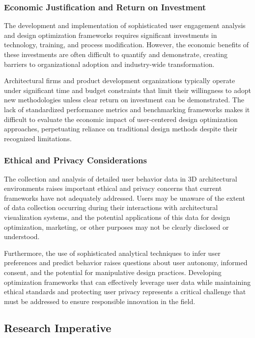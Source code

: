\subsubsection{Economic Justification and Return on Investment}
\label{subsubsec:economic_justification}

The development and implementation of sophisticated user engagement analysis and design optimization frameworks requires significant investments in technology, training, and process modification. However, the economic benefits of these investments are often difficult to quantify and demonstrate, creating barriers to organizational adoption and industry-wide transformation.

Architectural firms and product development organizations typically operate under significant time and budget constraints that limit their willingness to adopt new methodologies unless clear return on investment can be demonstrated. The lack of standardized performance metrics and benchmarking frameworks makes it difficult to evaluate the economic impact of user-centered design optimization approaches, perpetuating reliance on traditional design methods despite their recognized limitations.

\subsubsection{Ethical and Privacy Considerations}
\label{subsubsec:ethical_considerations}

The collection and analysis of detailed user behavior data in 3D architectural environments raises important ethical and privacy concerns that current frameworks have not adequately addressed. Users may be unaware of the extent of data collection occurring during their interactions with architectural visualization systems, and the potential applications of this data for design optimization, marketing, or other purposes may not be clearly disclosed or understood.

Furthermore, the use of sophisticated analytical techniques to infer user preferences and predict behavior raises questions about user autonomy, informed consent, and the potential for manipulative design practices. Developing optimization frameworks that can effectively leverage user data while maintaining ethical standards and protecting user privacy represents a critical challenge that must be addressed to ensure responsible innovation in the field.

\subsection{Research Imperative}
\label{subsec:research_imperative}

